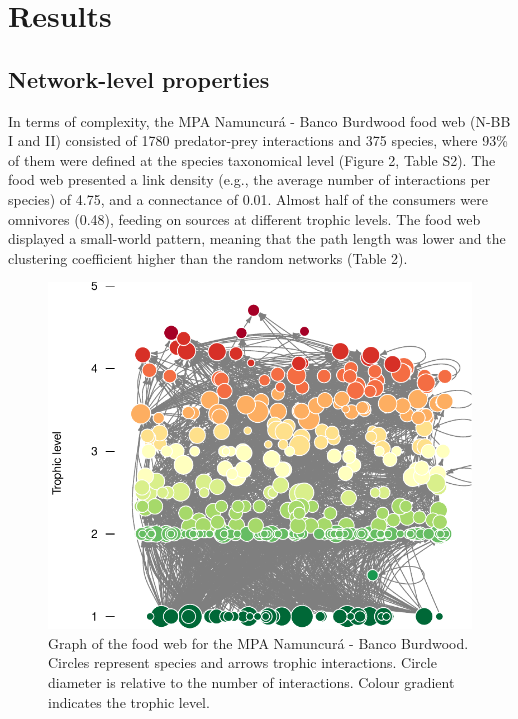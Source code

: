 \documentclass[preprint, 3p,
authoryear]{elsarticle} %
\begin{document}
\hypertarget{results}{%
\section{Results}\label{results}}

\hypertarget{network-level-properties}{%
\subsection{Network-level properties}\label{network-level-properties}}

In terms of complexity, the MPA Namuncurá - Banco Burdwood food web
(N-BB I and II) consisted of 1780 predator-prey interactions and 375
species, where 93\% of them were defined at the species taxonomical
level (Figure 2, Table S2). The food web presented a link density (e.g.,
the average number of interactions per species) of 4.75, and a
connectance of 0.01. Almost half of the consumers were omnivores (0.48),
feeding on sources at different trophic levels. The food web displayed a
small-world pattern, meaning that the path length was lower and the
clustering coefficient higher than the random networks (Table 2).

\newpage

\begin{figure}

{\centering \includegraphics{MS_Burdwood_foodweb_files/figure-latex/figure2-1} 

}

\caption{Graph of the food web for the MPA Namuncurá - Banco Burdwood. Circles represent species and arrows trophic interactions. Circle diameter is relative to the number of interactions. Colour gradient indicates the trophic level.}\label{fig:figure2}
\end{figure}
\end{document}
